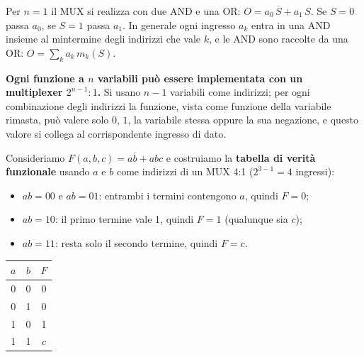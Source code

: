 \noindent Per $n=1$ il MUX si realizza con due AND e una OR:
$O = a_0\,\overline{S} + a_1\,S$. Se $S=0$ passa $a_0$, se $S=1$ passa $a_1$. In generale
ogni ingresso $a_k$ entra in una AND insieme al mintermine degli indirizzi che vale $k$, e le
AND sono raccolte da una OR: $O = \sum_k a_k\,m_k(S)$.

\medskip
\begin{important}
\textbf{Ogni funzione a $n$ variabili può essere implementata con un multiplexer
$2^{n-1}:1$.} Si usano $n-1$ variabili come indirizzi; per ogni combinazione degli indirizzi
la funzione, vista come funzione della variabile rimasta, può valere solo $0$, $1$, la
variabile stessa oppure la sua negazione, e questo valore si collega al corrispondente
ingresso di dato.
\end{important}

\noindent Consideriamo $F(a,b,c)=a\overline{b}+abc$ e costruiamo la \textbf{tabella di
verità funzionale} usando $a$ e $b$ come indirizzi di un MUX 4:1 ($2^{3-1}=4$ ingressi):
\begin{itemize}[leftmargin=1.5em, itemsep=1pt]
    \item $ab=00$ e $ab=01$: entrambi i termini contengono $a$, quindi $F=0$;
    \item $ab=10$: il primo termine vale 1, quindi $F=1$ (qualunque sia $c$);
    \item $ab=11$: resta solo il secondo termine, quindi $F=c$.
\end{itemize}

\begin{center}
\begin{minipage}[c]{0.3\linewidth}
\centering
\begin{tabular}{cc|c}
\toprule
$a$ & $b$ & $F$ \\
\midrule
0 & 0 & 0 \\
0 & 1 & 0 \\
1 & 0 & 1 \\
1 & 1 & $c$ \\
\bottomrule
\end{tabular}
\end{minipage}%
\begin{minipage}[c]{0.45\linewidth}
\centering
{}
\end{minipage}
\end{center}

